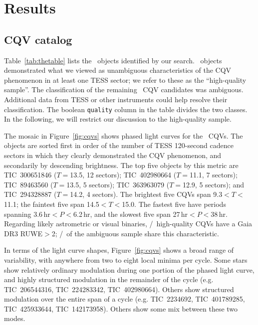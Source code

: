 \documentclass[11pt,twocolumn,tighten]{aastex63}
\begin{document}
\section{Results}
\label{sec:results}

\subsection{CQV catalog}
\label{sec:catalog}

Table~\ref{tab:thetable} lists the \ncpvsfound\ objects identified by
our search.  \ngoods\ objects demonstrated what we viewed as
unambiguous characteristics of the CQV phenomenon in at least one TESS
sector; we refer to these as the ``high-quality sample''.  The
classification of the remaining \nmaybes\ CQV candidates was
ambiguous.  Additional data from TESS or other instruments could help
resolve their classification.  The boolean \texttt{quality} column in
the table divides the two classes.  In the following, we will restrict
our discussion to the high-quality sample.

The mosaic in Figure~\ref{fig:cqvs} shows phased light curves for the
\ngoods\ CQVs.  The objects are sorted first in order of the
number of TESS 120-second cadence sectors in which they clearly
demonstrated the CQV phenomenon, and secondarily by descending
brightness.  The top five objects by this metric are TIC~300651846
($T$$=$13.5, 12 sectors); TIC~402980664 ($T$$=$11.1, 7 sectors);
TIC~89463560 ($T$$=$13.5, 5 sectors); TIC~363963079 ($T$$=$12.9, 5
sectors); and TIC~294328887 ($T$$=$14.2, 4 sectors).  The brightest
five CQVs span 9.3$<$$T$$<$11.1; the faintest five span
14.5$<$$T$$<$15.0.  The fastest five have periods spanning
3.6\,hr$<$$P$$<$6.2\,hr, and the slowest five span
27\,hr$<$$P$$<$38\,hr.
Regarding likely astrometric or visual binaries,
\ngoodhighruwe/\ngoods\ high-quality CQVs have a Gaia DR3 RUWE$>$2;
\nmaybehighruwe/\nmaybes\ of the ambiguous sample share this
characteristic.

In terms of the light curve shapes, Figure~\ref{fig:cqvs} shows a
broad range of variability, with anywhere from two to eight local
minima per cycle.  Some stars show relatively ordinary modulation
during one portion of the phased light curve, and highly
structured modulation in the remainder of the cycle (e.g.
TIC~206544316, TIC~224283342, TIC~402980664).  Others show structured
modulation over the entire span of a cycle (e.g. TIC~2234692,
TIC~401789285, TIC~425933644, TIC~142173958).  Others show some
mix between these two modes.
\end{document}
